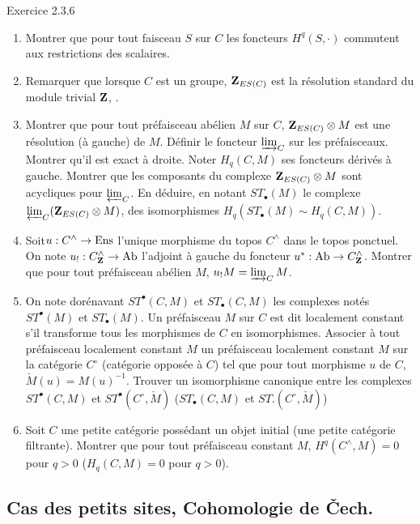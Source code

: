 \documentclass[10pt]{../fichiers-configuration-latex/smfart}
\begin{document}
\begin{enonce*}[remark]{Exercice 2.3.6}
\begin{enumerate}
\item Montrer que pour tout faisceau $S$ sur $C$ les foncteurs $H^q(S,⋅)$
 commutent aux restrictions des scalaires.

\item Remarquer que lorsque $C$ est un groupe, $\mathbf{Z}_{ES(C)}$ est la
  résolution standard du module trivial $\mathbf{Z}$, \cite{SGA4-05:3}.

\item Montrer que pour tout préfaisceau abélien $M$ sur $C$,
  $\mathbf{Z}_{ES(C)} \otimes M$ est une résolution (à gauche) de
  $M$. Définir le foncteur $\varinjlim_{C}$ sur les %
  préfaisceaux. Montrer qu'il est exact à droite. Noter $H_q(C,
  M)$ ses foncteurs dérivés à gauche. Montrer que les composants
  du complexe $\mathbf{Z}_{ES(C)} \otimes M$ sont acycliques pour
  $\varprojlim_{C}$. En déduire, en notant $ST_{∙}(M)$ le complexe
  $\varprojlim_{C}(\mathbf{Z}_{ES(C)} \otimes M)$, des isomorphismes
  $H_q(ST_{∙}(M) \sim H_q(C, M))$.

\item Soit\pageoriginale $u : C^{\wedge} \to \Ens$
  l'unique morphisme du topos $C^{\wedge}$ dans le topos
  ponctuel. On note $u_{!} : C^{\wedge}_{\ZZ} \to \Ab$
  l'adjoint à gauche du foncteur $u^\ast : \Ab \to
  C^{\wedge}_{\ZZ}$. Montrer que pour tout préfaisceau
  abélien $M$, $u_{!}M =\varinjlim_{C} M$.

\item On note dorénavant $ST^{∙}(C, M)$ et $ST_{∙}(C, M)$ les
  complexes notés $ST^{∙}(M)$ et $ST_{∙}(M)$. Un
  préfaisceau $M$ sur $C$ est dit localement constant s'il
  transforme tous  les morphismes de $C$ en isomorphismes. Associer
  à tout préfaisceau localement constant $M$ un préfaisceau
  localement constant $M$ sur la catégorie $C^{\circ}$ (catégorie
  opposée à $C$) tel que pour tout morphisme $u$ de $C$,
  $\check{M}(u) = M(u)^{-1}$. Trouver un isomorphisme canonique entre
  les complexes $ST^{∙}(C, M)$ et $ST^{∙}(C^{\circ},
  \check{M})$ (\resp $ST_{∙}(C, M)$ et $ST.(C^{\circ}, \check{M})$)

\item Soit $C$ une petite catégorie possédant un objet initial
  (\resp une petite catégorie filtrante). Montrer que pour tout
  préfaisceau constant $M$, $H^{q} (C^{\wedge}, M) =
  0$ pour $q > 0$ (\resp $H_q(C, M) = 0$ pour $q > 0$).
\end{enumerate}
\end{enonce*}

\subsection{Cas des petits sites, Cohomologie de Čech.}
\end{document}

